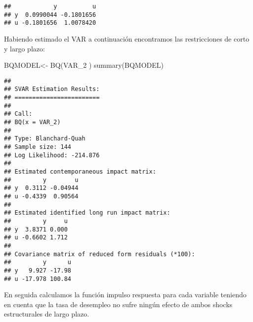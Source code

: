 \documentclass[
]{book}
\newenvironment{Shaded}{\begin{snugshade}}{\end{snugshade}}
\newcommand{\FunctionTok}[1]{\textcolor[rgb]{0.00,0.00,0.00}{#1}}
\newcommand{\NormalTok}[1]{#1}
\newcommand{\OtherTok}[1]{\textcolor[rgb]{0.56,0.35,0.01}{#1}}
\newcommand{\SpecialCharTok}[1]{\textcolor[rgb]{0.00,0.00,0.00}{#1}}
\begin{document}
\begin{Shaded}
\end{Shaded}

\begin{verbatim}
##            y          u
## y  0.0990044 -0.1801656
## u -0.1801656  1.0078420
\end{verbatim}

Habiendo estimado el VAR a continuación encontramos las restricciones de corto y largo plazo:

\begin{Shaded}
\begin{Highlighting}[]
\NormalTok{BQMODEL}\OtherTok{\textless{}{-}} \FunctionTok{BQ}\NormalTok{(VAR\_2 )}
\FunctionTok{summary}\NormalTok{(BQMODEL)}
\end{Highlighting}
\end{Shaded}

\begin{verbatim}
## 
## SVAR Estimation Results:
## ======================== 
## 
## Call:
## BQ(x = VAR_2)
## 
## Type: Blanchard-Quah 
## Sample size: 144 
## Log Likelihood: -214.876 
## 
## Estimated contemporaneous impact matrix:
##         y        u
## y  0.3112 -0.04944
## u -0.4339  0.90564
## 
## Estimated identified long run impact matrix:
##         y     u
## y  3.8371 0.000
## u -0.6602 1.712
## 
## Covariance matrix of reduced form residuals (*100):
##         y      u
## y   9.927 -17.98
## u -17.978 100.84
\end{verbatim}

En seguida calculamos la función impulso respuesta para cada variable teniendo en cuenta que la tasa de desempleo no sufre ningún efecto de ambos shocks estructurales de largo plazo.
\end{document}
